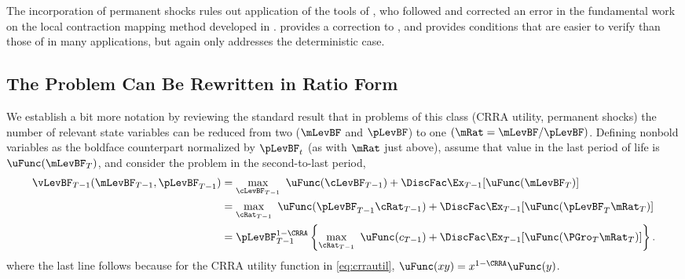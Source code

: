 \documentclass[./BufferStockTheory.tex]{subfiles}
\begin{document}
The incorporation of permanent shocks rules out application of the tools of \cite{mnUnique}, who followed and corrected an error in the fundamental work on the local contraction mapping method developed in \cite{rrExistence}.  \cite{mvExistence} provides a correction to \cite{rrExistence}, and provides conditions that are easier to verify than those of \cite{rrExistence} in many applications, but again only addresses the deterministic case.  

\hypertarget{The-Problem-Can-Be-Rewritten-in-Ratio-Form}{}
\subsection{The Problem Can Be Rewritten in Ratio Form}

\label{subsec:ratio}

We establish a bit more notation by reviewing the standard result that in problems of this class (CRRA utility, permanent shocks) the number of relevant state variables can be reduced from two ($\mLevBF$ and $\pLevBF$) to one $(\mRat = \mLevBF/\pLevBF)$.  Defining nonbold variables as the boldface counterpart normalized by $\pLevBF_{t}$ (as with $\mRat$ just above), assume that value in the last period of life is $\uFunc(\mLevBF_{T})$, and consider the problem in the second-to-last period,
\begin{align}
\vLevBF_{T-1}(\mLevBF_{T-1},\pLevBF_{T-1})  & = 
\max_{\cLevBF_{T-1}}~ \uFunc(\cLevBF_{T-1}) +\DiscFac \Ex_{T-1} [ \uFunc(\mLevBF_{T})]
\notag \\
 & =  \max_{\cRat_{T-1}}~
\uFunc(\pLevBF_{T-1}\cRat_{T-1}) + \DiscFac  \Ex_{T-1} [\uFunc(\pLevBF_{T}{\mRat}
_{T})]  \notag \\
 & = \pLevBF_{T-1}^{1-\CRRA}
\left\{\max_{\cRat_{T-1}}~ \uFunc(c_{T-1}) + \DiscFac \Ex_{T-1} [ \uFunc( {\PGro}_{T}
{\mRat}_{T}) ] \right\}  . \label{eq:vBold}
\end{align}
where the last line follows because for the CRRA utility function in \eqref{eq:crrautil}, $\uFunc(xy) =
x^{1-\CRRA}\uFunc(y)$.
\end{document}
